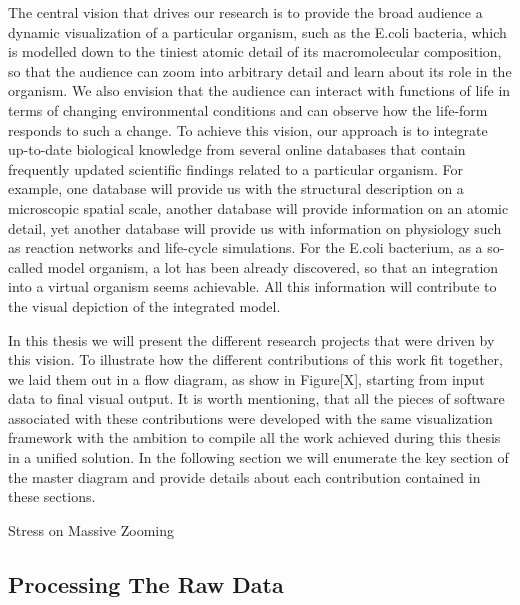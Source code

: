 The central vision that drives our research is to provide the broad audience a dynamic visualization of a particular organism, such as the E.coli bacteria, which is modelled down to the tiniest atomic detail of its macromolecular composition, so that the audience can zoom into arbitrary detail and learn about its role in the organism.
We also envision that the audience can interact with functions of life in terms of changing environmental conditions and can observe how the life-form responds to such a change. 
To achieve this vision, our approach is to integrate up-to-date biological knowledge from several online databases that contain frequently updated scientific findings related to a particular organism. 
For example, one database will provide us with the structural description on a microscopic spatial scale, another database will provide information on an atomic detail, yet another database will provide us with information on physiology such as reaction networks and life-cycle simulations. 
For the E.coli bacterium, as a so-called model organism, a lot has been already discovered, so that an integration into a virtual organism seems achievable.
All this information will contribute to the visual depiction of the integrated model.

In this thesis we will present the different research projects that were driven by this vision.
To illustrate how the different contributions of this work fit together, we laid them out in a flow diagram, as show in Figure[X], starting from input data to final visual output.
It is worth mentioning, that all the pieces of software associated with these contributions were developed with the same visualization framework with the ambition to compile all the work achieved during this thesis in a unified solution.
In the following section we will enumerate the key section of the master diagram and provide details about each contribution contained in these sections.

Stress on Massive Zooming

\subsection{Processing The Raw Data}

